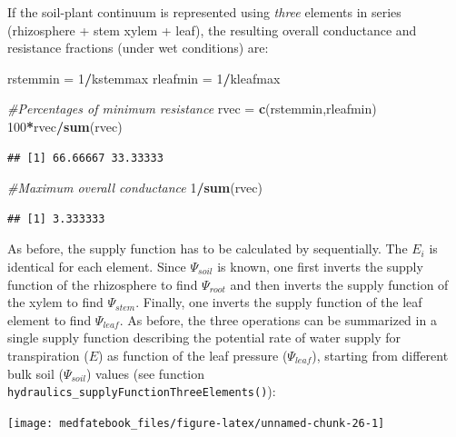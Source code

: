 \documentclass[]{book}
\newenvironment{Shaded}{\begin{snugshade}}{\end{snugshade}}
\newcommand{\KeywordTok}[1]{\textcolor[rgb]{0.13,0.29,0.53}{\textbf{#1}}}
\newcommand{\DecValTok}[1]{\textcolor[rgb]{0.00,0.00,0.81}{#1}}
\newcommand{\StringTok}[1]{\textcolor[rgb]{0.31,0.60,0.02}{#1}}
\newcommand{\CommentTok}[1]{\textcolor[rgb]{0.56,0.35,0.01}{\textit{#1}}}
\newcommand{\OperatorTok}[1]{\textcolor[rgb]{0.81,0.36,0.00}{\textbf{#1}}}
\newcommand{\NormalTok}[1]{#1}
\begin{document}
If the soil-plant continuum is represented using \emph{three} elements
in series (rhizosphere + stem xylem + leaf), the resulting overall
conductance and resistance fractions (under wet conditions) are:

\begin{Shaded}
\begin{Highlighting}[]
\NormalTok{rstemmin =}\StringTok{ }\DecValTok{1}\OperatorTok{/}\NormalTok{kstemmax}
\NormalTok{rleafmin =}\StringTok{ }\DecValTok{1}\OperatorTok{/}\NormalTok{kleafmax}

\CommentTok{#Percentages of minimum resistance}
\NormalTok{rvec =}\StringTok{ }\KeywordTok{c}\NormalTok{(rstemmin,rleafmin)}
\DecValTok{100}\OperatorTok{*}\NormalTok{rvec}\OperatorTok{/}\KeywordTok{sum}\NormalTok{(rvec)}
\end{Highlighting}
\end{Shaded}

\begin{verbatim}
## [1] 66.66667 33.33333
\end{verbatim}

\begin{Shaded}
\begin{Highlighting}[]
\CommentTok{#Maximum overall conductance}
\DecValTok{1}\OperatorTok{/}\KeywordTok{sum}\NormalTok{(rvec)}
\end{Highlighting}
\end{Shaded}

\begin{verbatim}
## [1] 3.333333
\end{verbatim}

As before, the supply function has to be calculated by sequentially. The
\(E_i\) is identical for each element. Since \(\Psi_{soil}\) is known,
one first inverts the supply function of the rhizosphere to find
\(\Psi_{root}\) and then inverts the supply function of the xylem to
find \(\Psi_{stem}\). Finally, one inverts the supply function of the
leaf element to find \(\Psi_{leaf}\). As before, the three operations
can be summarized in a single supply function describing the potential
rate of water supply for transpiration (\(E\)) as function of the leaf
pressure (\(\Psi_{leaf}\)), starting from different bulk soil
(\(\Psi_{soil}\)) values (see function
\texttt{hydraulics\_supplyFunctionThreeElements()}):

\begin{center}\texttt{[image: medfatebook\_files/figure-latex/unnamed-chunk-26-1]} \end{center}
\end{document}
